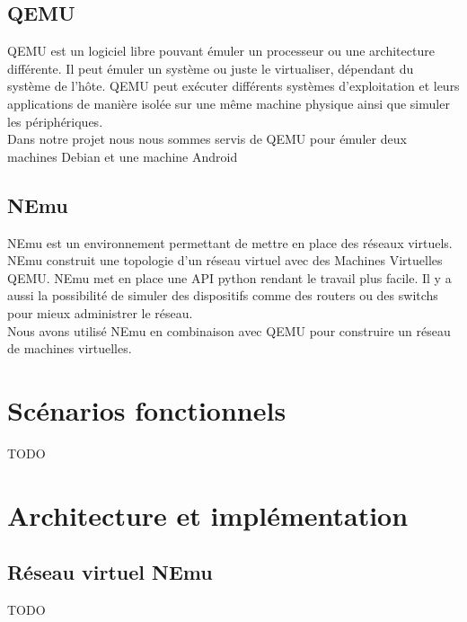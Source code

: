 \documentclass[12pt, openany]{report}
\begin{document}
\begin{flushleft}
\begin{itemize}
\begin{center}
\end{center}

\end{itemize} 
\end{flushleft}


\subsection{QEMU}
\noindent 
\begin{flushleft}
QEMU est un logiciel libre  pouvant émuler un processeur ou une architecture différente. Il peut émuler un système ou juste le virtualiser, dépendant du système de l'hôte. QEMU peut exécuter différents systèmes d'exploitation et leurs applications de manière isolée sur une même machine physique ainsi que simuler les périphériques. \\
Dans notre projet nous nous sommes servis de QEMU pour émuler deux machines Debian et une machine Android
\end{flushleft}

\subsection{NEmu}
\noindent 
\begin{flushleft}
NEmu est un environnement permettant de mettre en place des réseaux virtuels. NEmu construit une topologie d'un réseau virtuel avec des Machines Virtuelles QEMU. NEmu met en place une API python rendant le travail plus facile. Il y a aussi la possibilité de simuler des dispositifs comme des routers ou des switchs pour mieux administrer le réseau. \\
Nous avons utilisé NEmu en combinaison avec QEMU pour construire un réseau de machines virtuelles.
\end{flushleft}

\section{Scénarios fonctionnels}
\noindent 
\begin{flushleft}
TODO
\end{flushleft}

\section{Architecture et implémentation}

\subsection{Réseau virtuel NEmu}
\noindent 
\begin{flushleft}
TODO
\end{flushleft}
\end{document}
